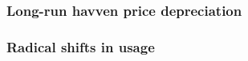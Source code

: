 \subsubsection{Long-run havven price depreciation}\label{sec:havven-depreciation}

\subsubsection{Radical shifts in usage}


\pagebreak